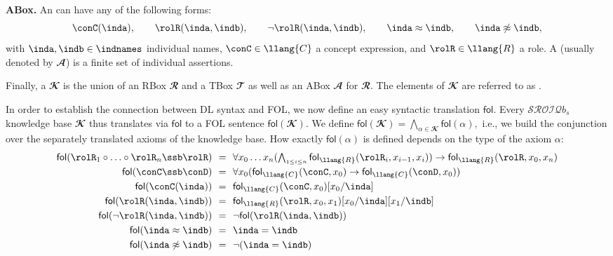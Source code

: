 \documentclass[10pt,a4paper]{amsart}
\theoremstyle{definition}
\numberwithin{equation}{section}
\theoremstyle{plain}
\theoremstyle{definition}
\theoremstyle{myexample}
\theoremstyle{plain}
\theoremstyle{definition}
\newcommand{\fcn}[1]{\mathsf{#1}}
\newcommand{\kb}{\mathbfcal{K}}
\begin{document}
\medskip\noindent\textbf{ABox. } 
%
An  can have any of the following forms:
$$\conC(\inda), \qquad \rolR(\inda,\indb), \qquad \neg\rolR(\inda,\indb), \qquad \inda\approx \indb, \qquad \inda\not\approx \indb,
$$%
with $\inda,\indb\in\indnames$ individual names, $\conC\in \llang{C}$ a concept expression, and $\rolR\in \llang{R}$ a role.
%
A \SROIQ{}  (usually denoted by $\mathbfcal{A}$) is a finite set of individual assertions. 

\medskip

Finally, a \SROIQ{}  $\kb$ is the union of an RBox $\mathbfcal{R}$ and a TBox $\mathbfcal{T}$ as well as an ABox $\mathbfcal{A}$ for $\mathbfcal{R}$. The elements of $\kb$ are referred to as . 

\bigskip

In order to establish the connection between DL syntax and FOL, we now define an easy syntactic translation $ \fcn{fol}$. Every $\mathcal{SROIQ}b_s$ knowledge base $\kb$ thus translates via $ \fcn{fol}$ to a FOL sentence $ \fcn{fol}(\kb)$. We define $\fcn{fol}(\kb)=\bigwedge_{\alpha\in \kb} \fcn{fol}(\alpha),$ i.e., we build the conjunction over the separately translated axioms of the knowledge base. How exactly $ \fcn{fol}(\alpha)$ is defined depends on the type of the axiom $\alpha$:
\[
\begin{array}{r@{\ \ }l@{\ \ }l}
	\fcn{fol}(\rolR_1\circ\ldots\circ\rolR_n\ssb\rolR) & = & \forall x_0\ldots x_n ( \bigwedge_{\scriptscriptstyle 1\leq i\leq n} \fcn{fol}_{ \llang{R}}(\rolR_i,x_{i-1},x_i)) \to  \fcn{fol}_{ \llang{R}}(\rolR,x_0,x_n)\\[1mm]
	\fcn{fol}(\conC\ssb\conD) & = & \forall x_0( \fcn{fol}_{ \llang{C}}(\conC,x_{0})\to  \fcn{fol}_{ \llang{C}}(\conD,x_{0}))\\[1mm]
	\fcn{fol}(\conC(\inda)) & = &  \fcn{fol}_{ \llang{C}}(\conC,x_{0})[x_0/\inda]\\[1mm]
	\fcn{fol}(\rolR(\inda,\indb)) & = &  \fcn{fol}_{ \llang{R}}(\rolR,x_{0},x_1)[x_0/\inda][x_1/\indb]\\[1mm]
	\fcn{fol}(\neg\rolR(\inda,\indb)) & = & \neg \fcn{fol}(\rolR(\inda,\indb))\\[1mm]
	\fcn{fol}(\inda\approx \indb) & = & \inda = \indb \\[1mm]
	\fcn{fol}(\inda\not\approx \indb) & = & \neg(\inda = \indb) \\
\end{array}
\]
\end{document}
